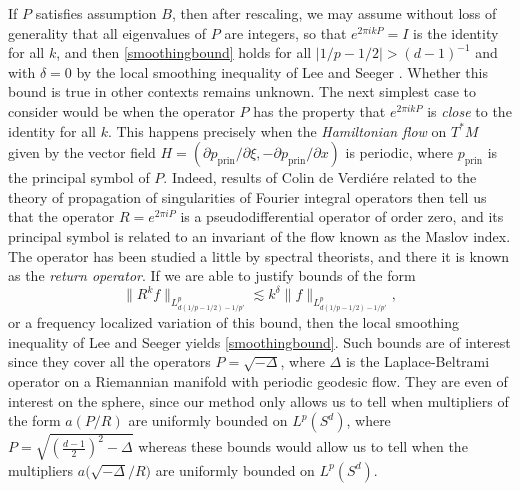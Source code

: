\documentclass[11pt]{article}
\begin{document}
If $P$ satisfies assumption $B$, then after rescaling, we may assume without loss of generality that all eigenvalues of $P$ are integers, so that $e^{2 \pi i k P} = I$ is the identity for all $k$, and then \eqref{smoothingbound} holds for all $|1/p - 1/2| > (d-1)^{-1}$ and with $\delta = 0$ by the local smoothing inequality of Lee and Seeger \cite{LeeSeeger}. Whether this bound is true in other contexts remains unknown. The next simplest case to consider would be when the operator $P$ has the property that $e^{2 \pi i k P}$ is \emph{close} to the identity for all $k$. This happens precisely when the \emph{Hamiltonian flow} on $T^* M$ given by the vector field $H = ( \partial p_{\text{prin}} / \partial \xi , - \partial p_{\text{prin}} / \partial x)$ is periodic, where $p_{\text{prin}}$ is the principal symbol of $P$. Indeed, results of Colin de Verdi\'{e}re \cite{ColinDeVerdiere} related to the theory of propagation of singularities of Fourier integral operators then tell us that the operator $R = e^{2 \pi i P}$ is a pseudodifferential operator of order zero, and its principal symbol is related to an invariant of the flow known as the Maslov index. The operator has been studied a little by spectral theorists, and there it is known as the \emph{return operator}. If we are able to justify bounds of the form
%
\[ \| R^k f \|_{L^p_{d(1/p - 1/2) - 1/p'}} \lesssim k^\delta \| f \|_{L^p_{d(1/p - 1/2) - 1/p'}}, \]
%
or a frequency localized variation of this bound, then the local smoothing inequality of Lee and Seeger yields \eqref{smoothingbound}. Such bounds are of interest since they cover all the operators $P = \sqrt{-\Delta}$, where $\Delta$ is the Laplace-Beltrami operator on a Riemannian manifold with periodic geodesic flow. They are even of interest on the sphere, since our method only allows us to tell when multipliers of the form $a( P/R )$ are uniformly bounded on $L^p(S^d)$, where $P = \sqrt{ ( {\scriptstyle \frac{d-1}{2}} )^2 - \Delta }$ whereas these bounds would allow us to tell when the multipliers $a \big( \sqrt{-\Delta} / R \big)$ are uniformly bounded on $L^p(S^d)$.
\end{document}
